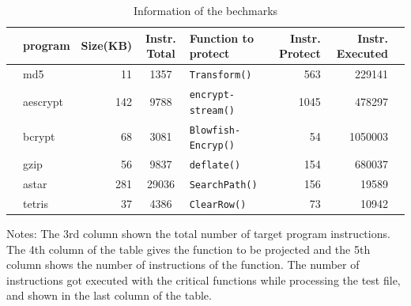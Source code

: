 \documentclass[preprint,12pt,3p]{elsarticle}
\begin{document}
\begin{table}[!t]
\scriptsize
\begin{center}
\caption{Information of the bechmarks\label{tab:Tab.3}}
{\begin{tabular}{@{}rlrclrrl@{}}
\toprule
   & \textbf{program} & \textbf{Size(KB)} & \textbf{Instr. Total} & \textbf{Function to protect} & \textbf{Instr. Protect} & \textbf{Instr. Executed} & \\
\midrule
   & md5 & 11 & 1357 & \texttt{Transform()} & 563 & 229141 & \\
   & aescrypt & 142 & 9788 &\texttt{encrypt-stream()} & 1045 & 478297 & \\
   & bcrypt & 68 & 3081 & \texttt{Blowfish-Encryp()} & 54 & 1050003 & \\
   & gzip & 56 & 9837 & \texttt{deflate()} & 154 & 680037 & \\
   & astar & 281 & 29036 & \texttt{SearchPath()} & 156 & 19589 & \\
   & tetris & 37 & 4386 & \texttt{ClearRow()} & 73 & 10942\footnotemark & \\
\bottomrule
\end{tabular}}{}
\end{center}
Notes: The 3rd column shown the total number of target program instructions. The 4th column of the table gives the function to be projected and the 5th column shows the number of instructions of the function. The number of instructions got executed with the critical functions while processing the test file, and shown in the last column of the table.
\end{table}
\end{document}
